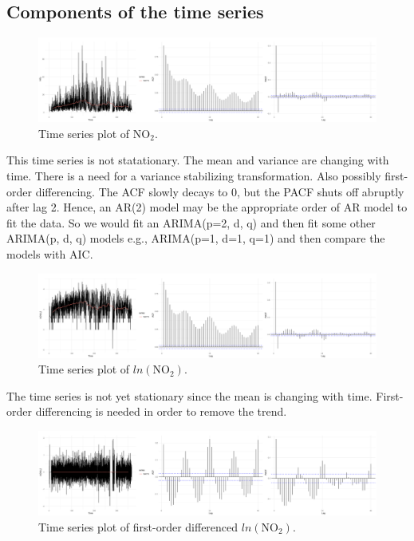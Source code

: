 \documentclass[a4paper, 10pt]{article}
\begin{document}
\begin{flushleft}
      \subsection*{Components of the time series}

      \begin{figure}[H]
         \centering
         \includegraphics[width=\linewidth]{../img/no2_ts_2019.png}
         \caption{Time series plot of $\text{NO}_{2}$.}
      \end{figure}

      This time series is not statationary. The mean and variance are changing with time. There is a need for a variance stabilizing transformation. Also possibly first-order differencing. The ACF slowly decays to 0, but the PACF shuts off abruptly after lag 2. Hence, an AR(2) model may be the appropriate order of AR model to fit the data. So we would fit an ARIMA(p=2, d, q) and then fit some other ARIMA(p, d, q) models e.g., ARIMA(p=1, d=1, q=1) and then compare the models with AIC.

      \begin{figure}[H]
         \centering
         \includegraphics[width=\linewidth]{../img/log_no2_ts_2019.png}
         \caption{Time series plot of $ln(\text{NO}_{2})$.}
      \end{figure}

      The time series is not yet stationary since the mean is changing with time. First-order differencing is needed in order to remove the trend.

      \begin{figure}[H]
         \centering
         \includegraphics[width=\linewidth]{../img/diff_log_no2_ts_2019.png}
         \caption{Time series plot of first-order differenced $ln(\text{NO}_{2})$.}
      \end{figure}


\end{flushleft}
\end{document}
